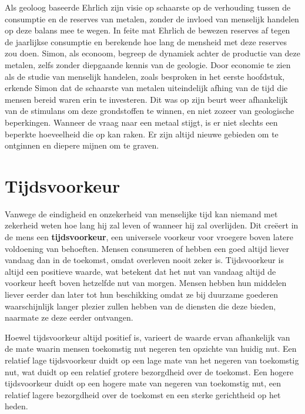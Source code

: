 Als geoloog baseerde Ehrlich zijn visie op schaarste op de verhouding tussen de consumptie en de reserves van metalen, zonder de invloed van menselijk handelen op deze balans mee te wegen. In feite mat Ehrlich de bewezen reserves af tegen de jaarlijkse consumptie en berekende hoe lang de mensheid met deze reserves zou doen. Simon, als econoom, begreep de dynamiek achter de productie van deze metalen, zelfs zonder diepgaande kennis van de geologie. Door economie te zien als de studie van menselijk handelen, zoals besproken in het eerste hoofdstuk, erkende Simon dat de schaarste van metalen uiteindelijk afhing van de tijd die mensen bereid waren erin te investeren. Dit was op zijn beurt weer afhankelijk van de stimulans om deze grondstoffen te winnen, en niet zozeer van geologische beperkingen. Wanneer de vraag naar een metaal stijgt, is er niet slechts een beperkte hoeveelheid die op kan raken. Er zijn altijd nieuwe gebieden om te ontginnen en diepere mijnen om te graven.

\section{Tijdsvoorkeur}

Vanwege de eindigheid en onzekerheid van menselijke tijd kan niemand met zekerheid weten hoe lang hij zal leven of wanneer hij zal overlijden. Dit creëert
in de mens een \textbf{tijdsvoorkeur}, een universele voorkeur voor
vroegere boven latere voldoening van behoeften. Mensen consumeren of
hebben een goed altijd liever vandaag dan in de toekomst, omdat
overleven nooit zeker is. Tijdsvoorkeur is altijd een positieve waarde,
wat betekent dat het nut van vandaag altijd de voorkeur heeft boven
hetzelfde nut van morgen. Mensen hebben hun middelen liever eerder dan later tot hun beschikking omdat ze bij duurzame goederen waarschijnlijk langer plezier zullen hebben van de diensten die deze bieden, naarmate ze deze eerder ontvangen.

Hoewel tijdsvoorkeur altijd positief is, varieert de waarde ervan
afhankelijk van de mate waarin mensen toekomstig nut negeren ten
opzichte van huidig nut. Een relatief lage tijdsvoorkeur duidt op een
lage mate van het negeren van toekomstig nut, wat duidt op een relatief
grotere bezorgdheid over de toekomst. Een hogere tijdsvoorkeur duidt op
een hogere mate van negeren van toekomstig nut, een relatief lagere
bezorgdheid over de toekomst en een sterke gerichtheid op het heden.

